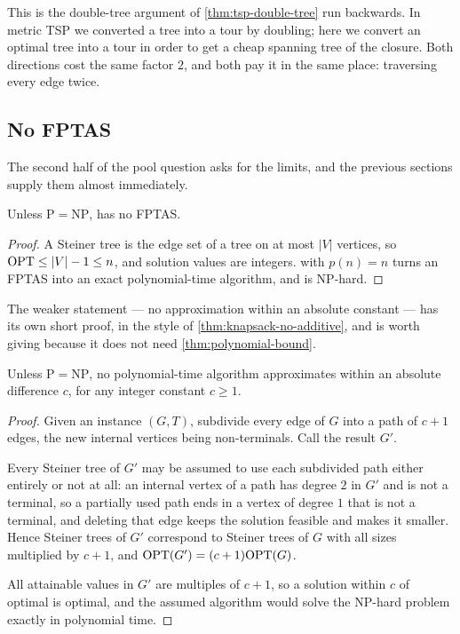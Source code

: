 \begin{intuition}
This is the double-tree argument of \cref{thm:tsp-double-tree} run backwards. In
metric TSP we converted a tree into a tour by doubling; here we convert an
optimal tree into a tour in order to get a cheap spanning tree of the closure.
Both directions cost the same factor $2$, and both pay it in the same place:
traversing every edge twice.
\end{intuition}

\subsection{No FPTAS}

The second half of the pool question asks for the limits, and the previous
sections supply them almost immediately.

\begin{theorem}\label{thm:steiner-no-fptas}
Unless $\mathrm{P} = \mathrm{NP}$,  has no FPTAS.
\end{theorem}

\begin{proof}
A Steiner tree is the edge set of a tree on at most $|V|$ vertices, so
$\mathrm{OPT} \le |V| - 1 \le n$, and solution values are integers.
 with $p(n) = n$ turns an FPTAS into an exact
polynomial-time algorithm, and  is \textrm{NP}-hard.
\end{proof}

The weaker statement --- no approximation within an absolute constant --- has
its own short proof, in the style of \cref{thm:knapsack-no-additive}, and is
worth giving because it does not need \cref{thm:polynomial-bound}.

\begin{proposition}\label{prop:steiner-no-additive}
Unless $\mathrm{P} = \mathrm{NP}$, no polynomial-time algorithm approximates
 within an absolute difference $c$, for any integer constant
$c \ge 1$.
\end{proposition}

\begin{proof}
Given an instance $(G,T)$, subdivide every edge of $G$ into a path of $c+1$
edges, the new internal vertices being non-terminals. Call the result $G'$.

Every Steiner tree of $G'$ may be assumed to use each subdivided path either
entirely or not at all: an internal vertex of a path has degree $2$ in $G'$ and
is not a terminal, so a partially used path ends in a vertex of degree $1$ that
is not a terminal, and deleting that edge keeps the solution feasible and makes
it smaller. Hence Steiner trees of $G'$ correspond to Steiner trees of $G$ with
all sizes multiplied by $c+1$, and $\mathrm{OPT}(G') = (c+1)\mathrm{OPT}(G)$.

All attainable values in $G'$ are multiples of $c+1$, so a solution within $c$
of optimal is optimal, and the assumed algorithm would solve the
\textrm{NP}-hard problem  exactly in polynomial time.
\end{proof}

